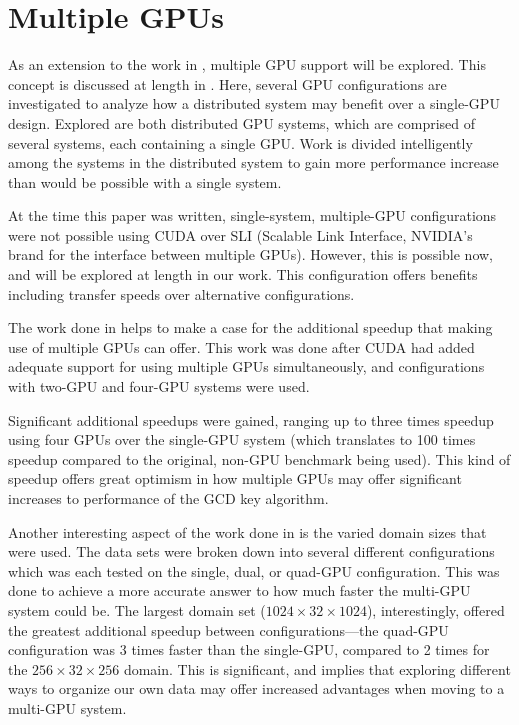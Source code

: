 \documentclass[12pt]{ucthesis}
\begin{document}
\section{Multiple GPUs}
As an extension to the work in \cite{scharfglass2012CUDA}, multiple GPU support
will be explored. This concept is discussed at length in
\cite{schaa2009exploring}. Here, several GPU configurations are investigated to
analyze how a distributed system may benefit over a single-GPU design.
Explored are both distributed GPU systems, which are comprised of several
systems, each containing a single GPU. Work is divided intelligently among the
systems in the distributed system to gain more performance increase than would
be possible with a single system.

At the time this paper was written, single-system, multiple-GPU configurations
were not possible using CUDA over SLI (Scalable Link Interface, NVIDIA's brand
for the interface between multiple GPUs). However, this is possible now, and
will be explored at length in our work. This configuration offers benefits
including transfer speeds over alternative configurations.

The work done in \cite{thibault2009cuda} helps to make a case for the
additional speedup that making use of multiple GPUs can offer. This work was
done after CUDA had added adequate support for using multiple GPUs
simultaneously, and configurations with two-GPU and four-GPU systems were used.

Significant additional speedups were gained, ranging up to three times speedup
using four GPUs over the single-GPU system (which translates to 100 times
speedup compared to the original, non-GPU benchmark being used). This kind of
speedup offers great optimism in how multiple GPUs may offer significant
increases to performance of the GCD key algorithm.

Another interesting aspect of the work done in \cite{thibault2009cuda} is the
varied domain sizes that were used. The data sets were broken down into several
different configurations which was each tested on the single, dual, or quad-GPU
configuration. This was done to achieve a more accurate answer to how much
faster the multi-GPU system could be. The largest domain set
($1024\times32\times1024$), interestingly, offered the greatest additional
speedup between configurations---the quad-GPU configuration was 3 times faster
than the single-GPU, compared to 2 times for the $256\times32\times256$
domain. This is significant, and implies that exploring different ways to
organize our own data may offer increased advantages when moving to a multi-GPU
system.
\end{document}
